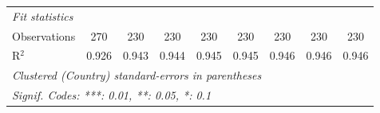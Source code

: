 \begin{table}[htbp]
\begin{tabular}{lcccccccc}
      \midrule \emph{Fit statistics}\\
      Observations                            & 270            & 230           & 230     & 230          & 230          & 230          & 230           & 230\\  
      R$^2$                                   & 0.926          & 0.943         & 0.944   & 0.945        & 0.945        & 0.946        & 0.946         & 0.946\\  
      \midrule
      \multicolumn{9}{l}{\emph{Clustered (Country) standard-errors in parentheses}}\\
      \multicolumn{9}{l}{\emph{Signif. Codes: ***: 0.01, **: 0.05, *: 0.1}}\\
   \end{tabular}
\end{table}


